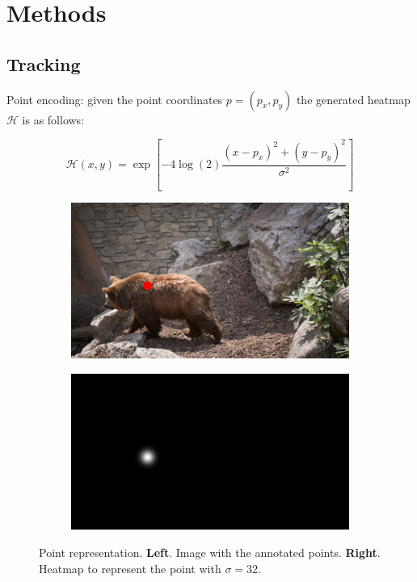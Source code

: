 
\chapter{Methods}
\label{cha:methods}

\section{Tracking}
\label{sec:methods_tracking}



Point encoding: given the point coordinates $p = (p_x, p_y)$ the generated heatmap $\mathcal{H}$ is as follows:

\begin{equation}
  \mathcal{H}(x, y) = \exp \left[ -4 \log(2) \frac{ (x - p_x)^2 + (y - p_y)^2 }{ \sigma^2 } \right]
\end{equation}


\begin{figure}[h]
\centering
\begin{subfigure}{.5\textwidth}
  \centering
  \includegraphics[width=.8\linewidth]{figures/methods/heatmaps/image_point.png}
\end{subfigure}%
\begin{subfigure}{.5\textwidth}
  \centering
  \includegraphics[width=.8\linewidth]{figures/methods/heatmaps/heatmap.png}
\end{subfigure}
\label{fig:point_representation}
\caption{
Point representation.
\textbf{Left}. Image with the annotated points.
\textbf{Right}. Heatmap to represent the point with $\sigma = 32$. }
\end{figure}


